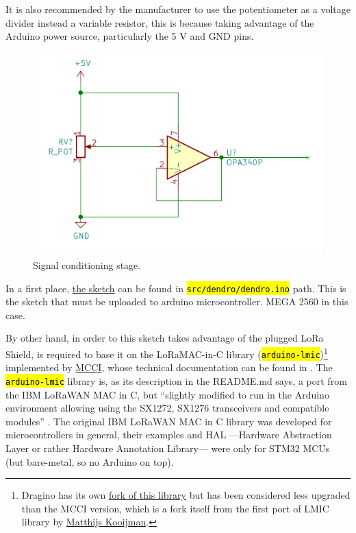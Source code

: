 \documentclass[11pt,a4paper,dvipsnames,twoside]{article}
\newcounter{subsubsubsection}[subsubsection]
\newcommand{\cmd}[1] {\hl{\texttt{#1}}}
\begin{document}
It is also recommended by the manufacturer to use the potentiometer as a voltage divider instead a variable resistor, this is because taking advantage of the Arduino power source, particularly the 5 \si{\volt} and GND pins.

\begin{figure}[htp]
  \centering
    \includegraphics[width=.9\textwidth]{../schemes/Signal_Conditioning.png}
  \caption{Signal conditioning stage.}
  \label{fig:SignalCond}
\end{figure}

In a first place, \href{https://github.com/WyRe/lora-arduino-dendrometer/blob/master/src/arduino/dendro/dendro.ino}{the sketch} can be found in \cmd{src/dendro/dendro.ino} path. This is the sketch that must be uploaded to arduino microcontroller. MEGA 2560 in this case.

By other hand, in order to this sketch takes advantage of the plugged LoRa Shield, is required to base it on the LoRaMAC-in-C library \cite{MCCI_lmic} (\cmd{arduino-lmic})\footnote{Dragino has its own \href{https://github.com/dragino/arduino-lmic}{fork of this library} but has been considered less upgraded than the MCCI version, which is a fork itself from the first port of LMIC library by \href{https://github.com/matthijskooijman}{Matthijs Kooijman}.} implemented by \href{https://mcci.com/}{MCCI}, whose technical documentation can be found in \cite{MCCI_lmic_docs}. The \cmd{arduino-lmic} library is, as its description in the README.md says, a port from the IBM LoRaWAN MAC in C, but \enquote{slightly modified to run in the Arduino environment allowing using the SX1272, SX1276 transceivers and compatible modules} \cite{MCCI_lmic}. The original IBM LoRaWAN MAC in C library was developed for microcontrollers in general, their examples and HAL ---Hardware Abstraction Layer or rather Hardware Annotation Library--- were only for STM32 MCUs (but bare-metal, so no Arduino on top). 
\end{document}

